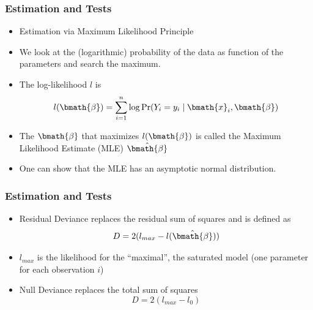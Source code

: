 \documentclass[extsize,handout,10pt]{beamer}\usepackage[]{graphicx}\usepackage[]{color}
\begin{document}
\begin{frame}
  \frametitle{Estimation and Tests}
  \begin{itemize}
  \item Estimation via \alert{Maximum Likelihood Principle} 
  \item We look at the (logarithmic) probability of the data \alert{as function of the
    parameters} and search the maximum.
  \item The log-likelihood $l$ is
    \begin{equation}
      \label{eq:1}
      l(\bmath{\beta})=\sum_{i=1}^n \log \Pr(Y_i=y_i \mid \bmath{x}_i,\bmath{\beta})
    \end{equation}
  \item The $\bmath{\beta}$ that maximizes $l(\bmath{\beta})$ is called the
    \alert{Maximum Likelihood Estimate (MLE)} $\hat{\bmath{\beta}}$
  \item One can show that the MLE has an asymptotic normal
    distribution.
  \end{itemize}
\end{frame}



\begin{frame}
  \frametitle{Estimation and Tests}
  \begin{itemize}
  \item \alert{Residual Deviance} replaces the \alert{residual sum of squares} 
    and is defined as
    \begin{equation}
      \label{eq:2}
      D=2(l_{max}-l(\hat{\bmath{\beta}}))
    \end{equation}
  \item $l_{max}$ is the likelihood for the ``maximal'', the saturated
    model (one parameter for each observation $i$)
  \item \alert{Null Deviance} replaces the \alert{total sum of
      squares}
\begin{equation}
      \label{eq:2}
      D=2(l_{max}-l_0)
    \end{equation}
\end{itemize}
\end{frame}
\end{document}
